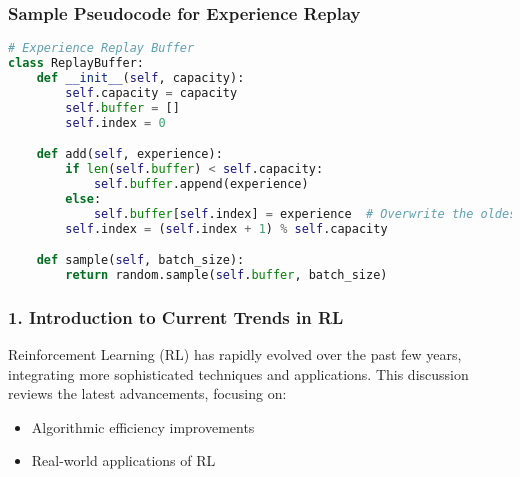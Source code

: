 \documentclass[aspectratio=169]{beamer}
\begin{document}
\begin{frame}[fragile]
    \frametitle{Sample Pseudocode for Experience Replay}
    \begin{lstlisting}[language=Python]
# Experience Replay Buffer
class ReplayBuffer:
    def __init__(self, capacity):
        self.capacity = capacity
        self.buffer = []
        self.index = 0

    def add(self, experience):
        if len(self.buffer) < self.capacity:
            self.buffer.append(experience)
        else:
            self.buffer[self.index] = experience  # Overwrite the oldest experience
        self.index = (self.index + 1) % self.capacity

    def sample(self, batch_size):
        return random.sample(self.buffer, batch_size)
    \end{lstlisting}
\end{frame}

\begin{frame}[fragile]
    \frametitle{1. Introduction to Current Trends in RL}
    Reinforcement Learning (RL) has rapidly evolved over the past few years, integrating more sophisticated techniques and applications. This discussion reviews the latest advancements, focusing on:
    \begin{itemize}
        \item Algorithmic efficiency improvements
        \item Real-world applications of RL
    \end{itemize}
\end{frame}
\end{document}
